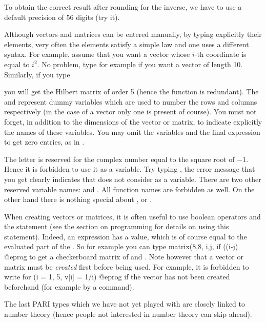 To obtain the correct result after rounding for the inverse, we have to use a
default precision of 56 digits (try it).
\smallskip

Although vectors and matrices can be entered manually, by typing explicitly
their elements, very often the elements satisfy a simple law and one uses a
different syntax. For example, assume that you want a vector whose $i$-th
coordinate is equal to $i^2$. No problem, type for example
 if you want a vector of length 10. Similarly, if
you type

\centerline{}

\noindent you will get the Hilbert matrix of order 5 (hence the
 function is redundant).  The  and  represent
dummy variables which are used to number the rows and columns respectively
(in the case of a vector only one is present of course). You must not forget,
in addition to the dimensions of the vector or matrix, to indicate explicitly
the names of these variables. You may omit the variables and the final
expression to get zero entries, as in .

 The letter  is reserved for the complex number
equal to the square root of $-1$. Hence it is forbidden to use it as a
variable. Try typing , the error message that you
get clearly indicates that  does not consider  as a variable.
There are two other reserved variable names:  and . All
function names are forbidden as well. On the other hand there is nothing
special about ,  or .

When creating vectors or matrices, it is often useful to use boolean
operators and the  statement (see the section on programming for
details on using this statement). Indeed, an  expression has a value,
which is of course equal to the evaluated part of the . So for
example you can type
\bprog
matrix(8,8, i,j, if ((i-j)%
@eprog
\noindent to get a checkerboard matrix of  and . Note however
that a vector or matrix must be \emph{created} first before being used. For
example, it is forbidden to write
\bprog
for (i = 1, 5, v[i] = 1/i)
@eprog
\noindent if the vector  has not been created beforehand (for example
by a  command).

\medskip The last PARI types which we have not yet played with are closely
linked to number theory (hence people not interested in number theory can
skip ahead).

